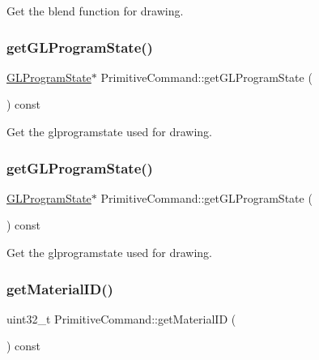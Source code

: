 Get the blend function for drawing. \mbox{\label{classPrimitiveCommand_a0045e39f2f8fa3cab081bacc6ddac422}} 
\subsubsection{\texorpdfstring{get\+G\+L\+Program\+State()}{getGLProgramState()}\hspace{0.1cm}{\footnotesize\ttfamily [1/2]}}
{\footnotesize\ttfamily \hyperlink{classGLProgramState}{G\+L\+Program\+State}$\ast$ Primitive\+Command\+::get\+G\+L\+Program\+State (\begin{DoxyParamCaption}{ }\end{DoxyParamCaption}) const\hspace{0.3cm}{\ttfamily [inline]}}

Get the glprogramstate used for drawing. \mbox{\label{classPrimitiveCommand_a0045e39f2f8fa3cab081bacc6ddac422}} 
\subsubsection{\texorpdfstring{get\+G\+L\+Program\+State()}{getGLProgramState()}\hspace{0.1cm}{\footnotesize\ttfamily [2/2]}}
{\footnotesize\ttfamily \hyperlink{classGLProgramState}{G\+L\+Program\+State}$\ast$ Primitive\+Command\+::get\+G\+L\+Program\+State (\begin{DoxyParamCaption}{ }\end{DoxyParamCaption}) const\hspace{0.3cm}{\ttfamily [inline]}}

Get the glprogramstate used for drawing. \mbox{\label{classPrimitiveCommand_a524b9922884e50c3512a5064ecf1514d}} 
\subsubsection{\texorpdfstring{get\+Material\+I\+D()}{getMaterialID()}\hspace{0.1cm}{\footnotesize\ttfamily [1/2]}}
{\footnotesize\ttfamily uint32\+\_\+t Primitive\+Command\+::get\+Material\+ID (\begin{DoxyParamCaption}{ }\end{DoxyParamCaption}) const\hspace{0.3cm}{\ttfamily [inline]}}

